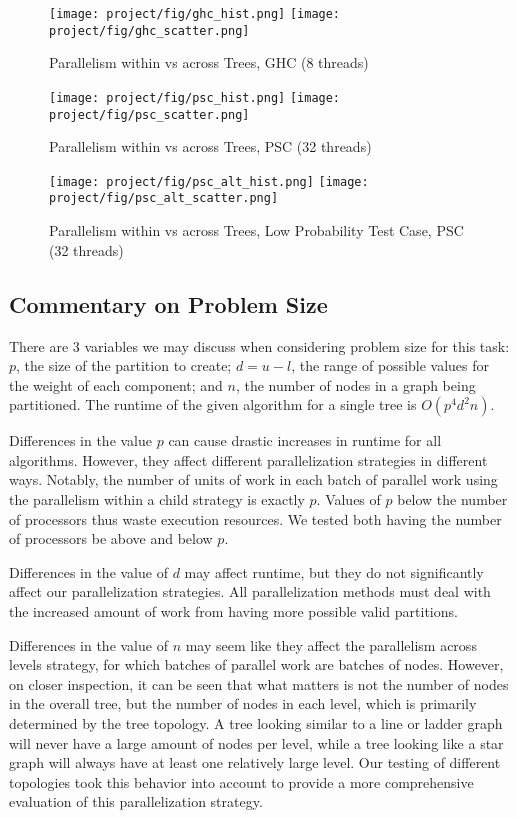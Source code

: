 \documentclass[11pt]{article}
\begin{document}
\begin{figure}
    \centering
    \texttt{[image: project/fig/ghc\_hist.png]}
    \texttt{[image: project/fig/ghc\_scatter.png]}
    \caption{Parallelism within vs across Trees, GHC (8 threads)}
    \label{fig:ghc_multiple_tree}
\end{figure}

\begin{figure}
    \centering
    \texttt{[image: project/fig/psc\_hist.png]}
    \texttt{[image: project/fig/psc\_scatter.png]}
    \caption{Parallelism within vs across Trees, PSC (32 threads)}
    \label{fig:psc_multiple_tree}
\end{figure}

\begin{figure}
    \centering
    \texttt{[image: project/fig/psc\_alt\_hist.png]}
    \texttt{[image: project/fig/psc\_alt\_scatter.png]}
    \caption{Parallelism within vs across Trees, Low Probability Test Case, PSC (32 threads)}
    \label{fig:psc_multiple_tree_alt}
\end{figure}

\subsection{Commentary on Problem Size}

There are 3 variables we may discuss when considering problem size for this task: $p$, the size of the partition to create; $d = u - l$, the range of possible values for the weight of each component; and $n$, the number of nodes in a graph being partitioned.
The runtime of the given algorithm for a single tree is $O(p^4 d^2 n)$.

Differences in the value $p$ can cause drastic increases in runtime for all algorithms.
However, they affect different parallelization strategies in different ways.
Notably, the number of units of work in each batch of parallel work using the parallelism within a child strategy is exactly $p$.
Values of $p$ below the number of processors thus waste execution resources.
We tested both having the number of processors be above and below $p$.

Differences in the value of $d$ may affect runtime, but they do not significantly affect our parallelization strategies.
All parallelization methods must deal with the increased amount of work from having more possible valid partitions.

Differences in the value of $n$ may seem like they affect the parallelism across levels strategy, for which batches of parallel work are batches of nodes.
However, on closer inspection, it can be seen that what matters is not the number of nodes in the overall tree, but the number of nodes in each level, which is primarily determined by the tree topology.
A tree looking similar to a line or ladder graph will never have a large amount of nodes per level, while a tree looking like a star graph will always have at least one relatively large level.
Our testing of different topologies took this behavior into account to provide a more comprehensive evaluation of this parallelization strategy.
\end{document}
